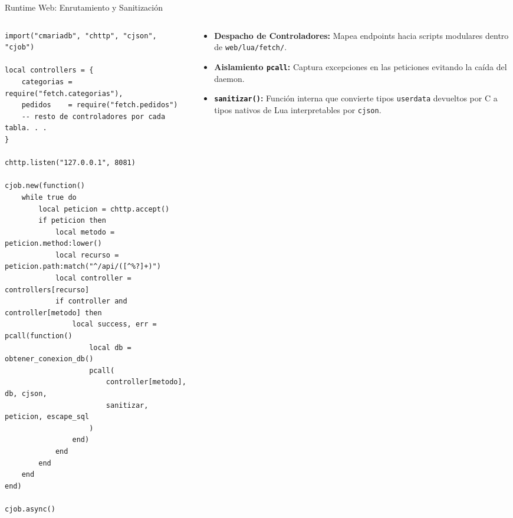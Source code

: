\documentclass[10pt,aspectratio=169]{beamer}
\begin{document}
\begin{frame}[fragile]{Runtime Web: Enrutamiento y Sanitización}
\begin{columns}[T]
\begin{column}{0.60\textwidth}
\begin{lstlisting}[style=luastyle, caption={Ciclo principal en program.fetch.lua}]
import("cmariadb", "chttp", "cjson", "cjob")

local controllers = {
    categorias = require("fetch.categorias"),
    pedidos    = require("fetch.pedidos")
    -- resto de controladores por cada tabla. . .
}

chttp.listen("127.0.0.1", 8081)

cjob.new(function()
    while true do
        local peticion = chttp.accept()
        if peticion then
            local metodo = peticion.method:lower()
            local recurso = peticion.path:match("^/api/([^%?]+)")
            local controller = controllers[recurso]
            if controller and controller[metodo] then
                local success, err = pcall(function()
                    local db = obtener_conexion_db()
                    pcall(
                        controller[metodo], db, cjson,
                        sanitizar, peticion, escape_sql
                    )
                end)
            end
        end
    end
end)

cjob.async()
\end{lstlisting}
\end{column}
\begin{column}{0.45\textwidth}
\begin{itemize}
    \item \textbf{Despacho de Controladores:} Mapea endpoints hacia scripts modulares dentro de \texttt{web/lua/fetch/}.
    \item \textbf{Aislamiento \texttt{pcall}:} Captura excepciones en las peticiones evitando la caída del daemon.
    \item \textbf{\texttt{sanitizar()}:} Función interna que convierte tipos \texttt{userdata} devueltos por C a tipos nativos de Lua interpretables por \texttt{cjson}.
\end{itemize}
\end{column}
\end{columns}
\end{frame}
\end{document}
